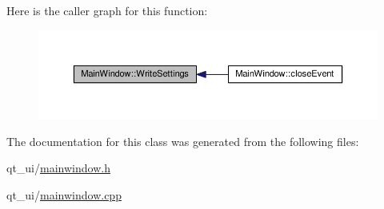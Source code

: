 Here is the caller graph for this function\+:
\nopagebreak
\begin{figure}[H]
\begin{center}
\leavevmode
\includegraphics[width=350pt]{class_main_window_a56a5e4d5e0a022e8c1ecf350d2916ade_icgraph}
\end{center}
\end{figure}




The documentation for this class was generated from the following files\+:\begin{DoxyCompactItemize}
\item 
qt\+\_\+ui/\hyperlink{mainwindow_8h}{mainwindow.\+h}\item 
qt\+\_\+ui/\hyperlink{mainwindow_8cpp}{mainwindow.\+cpp}\end{DoxyCompactItemize}
